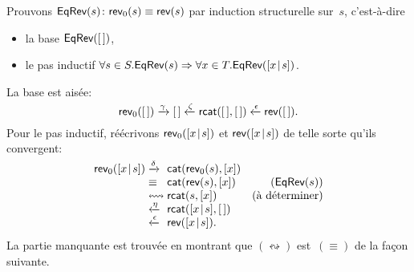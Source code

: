 Prouvons \label{EqRev} \(\textsf{EqRev}({s}) \colon \textsf{rev}_0(s) \equiv
\textsf{rev}(s)\)
par induction
structurelle sur~\(s\), c'est-à-dire
\begin{itemize}

  \item la base \(\textsf{EqRev}({[\,]})\),

  \item le pas inductif \(\forall s \in S.\textsf{EqRev}({s}) \Rightarrow
    \forall x \in T.\textsf{EqRev}({[{x}\!\mid\!{s}]})\).

\end{itemize}
La base est aisée:
\begin{equation*}
  \fun{rev}_0(\el) \xrightarrow{\smash{\gamma}} \el
  \xleftarrow{\smash{\zeta}} \fun{rcat}(\el,\el)
  \xleftarrow{\smash{\epsilon}}
  \fun{rev}(\el).
  \index{rev0@\fun{rev\(_0\)/1}}
\end{equation*}
Pour le pas inductif, réécrivons \(\textsf{rev}_0([{x}\!\mid\!{s}])\) et
\(\textsf{rev}([{x}\!\mid\!{s}])\) de telle sorte qu'ils convergent:
\begin{equation*}
\begin{array}{@{}r@{\;}l@{\;}lr@{}}
  \fun{rev}_0(\cons{x}{s})
& \xrightarrow{\smash{\delta}}
& \fun{cat}(\fun{rev}_0(s),[x])\\
& \equiv
& \fun{cat}(\fun{rev}(s),[x])
& (\pred{EqRev}{s})\\
& \leftrightsquigarrow
& \fun{rcat}(s,[x])
& (\text{à déterminer})\\
& \xleftarrow{\smash{\eta}}
& \fun{rcat}(\cons{x}{s},\el)\\
& \xleftarrow{\smash{\epsilon}}
& \fun{rev}(\cons{x}{s}).
\end{array}
\end{equation*}
La partie manquante est trouvée en montrant que
\((\leftrightsquigarrow)\) est~\((\equiv)\) de la façon
suivante.

